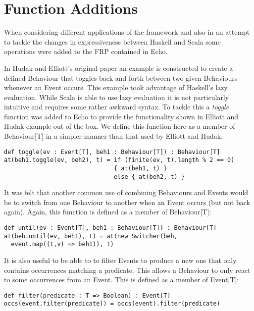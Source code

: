   \section{Function Additions}
    When considering different applications of the framework and also in an attempt to
    tackle the changes in expressiveness between Haskell and Scala some operations
    were added to the FRP contained in Echo.
        
    In Hudak and Elliott's original paper an example is constructed to create a defined Behaviour
    that toggles back and forth between two given Behaviours whenever an Event occurs. This
    example took advantage of Haskell's lazy evaluation. While Scala is able to use lazy evaluation
    it is not particularly intuitive and requires some rather awkward syntax. To tackle this
    a \emph{toggle} function was added to Echo to provide the functionality shown in Elliott and Hudak example out of the box.
    We define this function here as a member of Behaviour[T] in a simpler manner than that used by Elliott and Hudak:
    
\begin{verbatim}
def toggle(ev : Event[T], beh1 : Behaviour[T]) : Behaviour[T]
at(beh1.toggle(ev, beh2), t) = if (finite(ev, t).length % 2 == 0)
                               { at(beh1, t) } 
                               else { at(beh2, t) }
\end{verbatim}        
    
    It was felt that another common use of combining Behaviours and Events would be
    to switch from one Behaviour to another when an Event occurs (but not back again). Again, this
    function is defined as a member of Behaviour[T]:

\begin{verbatim}
def until(ev : Event[T], beh1 : Behaviour[T]) : Behaviour[T]
at(beh.until(ev, beh1), t) = at(new Switcher(beh, 
  event.map((t,v) => beh1)), t)
\end{verbatim}        
    
    It is also useful to be able to to filter Events to produce a new one that only
    contains occurrences matching a predicate. This allows a Behaviour to only react
    to some occurrences from an Event. This is defined as a member of Event[T]:

\begin{verbatim}
def filter(predicate : T => Boolean) : Event[T]
occs(event.filter(predicate)) = occs(event).filter(predicate)
\end{verbatim}  

